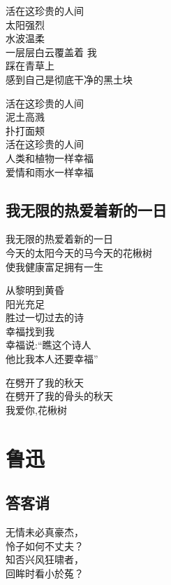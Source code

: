 \documentclass[
]{book}
\renewenvironment{quote}{\begin{VF}}{\end{VF}}
\begin{document}
\begin{quote}
活在这珍贵的人间\\
太阳强烈\\
水波温柔\\
一层层白云覆盖着
我\\
踩在青草上\\
感到自己是彻底干净的黑土块

活在这珍贵的人间\\
泥土高溅\\
扑打面颊\\
活在这珍贵的人间\\
人类和植物一样幸福\\
爱情和雨水一样幸福
\end{quote}

\hypertarget{section-24}{%
\section{我无限的热爱着新的一日}\label{section-24}}

\begin{quote}
我无限的热爱着新的一日\\
今天的太阳今天的马今天的花楸树\\
使我健康富足拥有一生

从黎明到黄昏\\
阳光充足\\
胜过一切过去的诗\\
幸福找到我\\
幸福说:``瞧这个诗人\\
他比我本人还要幸福''

在劈开了我的秋天\\
在劈开了我的骨头的秋天\\
我爱你,花楸树
\end{quote}

\hypertarget{section-25}{%
\chapter{鲁迅}\label{section-25}}

\hypertarget{section-26}{%
\section{答客诮}\label{section-26}}

\begin{quote}
无情未必真豪杰，\\
怜子如何不丈夫？\\
知否兴风狂啸者，\\
回眸时看小於菟？
\end{quote}
\end{document}
